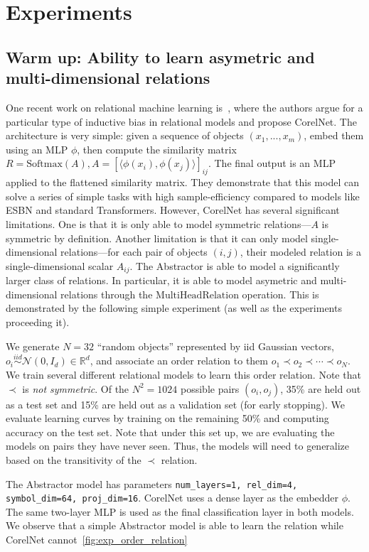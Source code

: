 
\section{Experiments}\label{sec:experiments}

\subsection{Warm up: Ability to learn asymetric and multi-dimensional relations}
One recent work on relational machine learning is~\cite{kerg2022neural}, where the authors argue for a particular type of inductive bias in relational models and propose CorelNet. The architecture is very simple: given a sequence of objects $(x_1, ..., x_m)$, embed them using an MLP $\phi$, then compute the similarity matrix $R = \text{Softmax}(A), A = \left[\langle\phi(x_i), \phi(x_j)\rangle\right]_{ij}$. The final output is an MLP applied to the flattened similarity matrix. They demonstrate that this model can solve a series of simple tasks with high sample-efficiency compared to models like ESBN and standard Transformers. However, CorelNet has several significant limitations. One is that it is only able to model symmetric relations---$A$ is symmetric by definition. Another limitation is that it can only model single-dimensional relations---for each pair of objects $(i,j)$, their modeled relation is a single-dimensional scalar $A_{ij}$. The Abstractor is able to model a significantly larger class of relations. In particular, it is able to model asymetric and multi-dimensional relations through the $\text{MultiHeadRelation}$ operation. This is demonstrated by the following simple experiment (as well as the experiments proceeding it).

We generate $N = 32$ ``random objects'' represented by iid Gaussian vectors, $o_i \overset{iid}{\sim} \mathcal{N}(0, I_d) \in \mathbb{R}^d$, and associate an order relation to them $o_1 \prec o_2 \prec \cdots \prec o_N$. We train several different relational models to learn this order relation. Note that $\prec$ is \textit{not symmetric}. Of the $N^2 = 1024$ possible pairs $(o_i, o_j)$, 35\% are held out as a test set and 15\% are held out as a validation set (for early stopping). We evaluate learning curves by training on the remaining 50\% and computing accuracy on the test set. Note that under this set up, we are evaluating the models on pairs they have never seen. Thus, the models will need to generalize based on the transitivity of the $\prec$ relation.

The Abstractor model %
has parameters \texttt{num\_layers=1, rel\_dim=4, symbol\_dim=64, proj\_dim=16}. CorelNet uses a dense layer as the embedder $\phi$. The same two-layer MLP is used as the final classification layer in both models. We observe that a simple Abstractor model is able to learn the relation while CorelNet cannot~\cref{fig:exp_order_relation}

